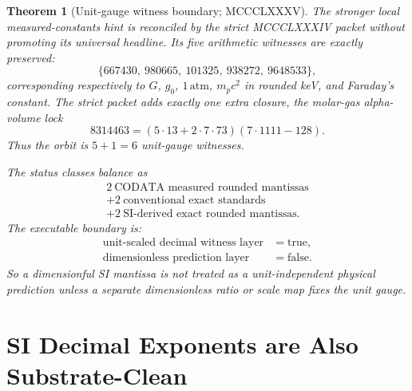 \documentclass[11pt]{article}
\newtheorem{theorem}{Theorem}[section]
\begin{document}
\begin{theorem}[Unit-gauge witness boundary; MCCCLXXXV]\label{thm:unit_gauge_witness_boundary}
The stronger local measured-constants hint is reconciled by the strict
MCCCLXXXIV packet without promoting its universal headline.  Its five
arithmetic witnesses are exactly preserved:
\[
  \{667430,\ 980665,\ 101325,\ 938272,\ 9648533\},
\]
corresponding respectively to $G$, $g_0$, $1\,\mathrm{atm}$, $m_pc^2$
in rounded keV, and Faraday's constant.  The strict packet adds exactly
one extra closure, the molar-gas alpha-volume lock
\[
  8314463=(5\cdot13+2\cdot7\cdot73)(7\cdot1111-128).
\]
Thus the orbit is $5+1=6$ unit-gauge witnesses.

The status classes balance as
\[
  \begin{gathered}
  2\ \text{CODATA measured rounded mantissas}\\
  +2\ \text{conventional exact standards}\\
  +2\ \text{SI-derived exact rounded mantissas}.
  \end{gathered}
\]
The executable boundary is:
\[
  \begin{aligned}
  \text{unit-scaled decimal witness layer}&=\mathrm{true},\\
  \text{dimensionless prediction layer}&=\mathrm{false}.
  \end{aligned}
\]
So a dimensionful SI mantissa is not treated as a unit-independent
physical prediction unless a separate dimensionless ratio or scale map
fixes the unit gauge.
\end{theorem}

\section{SI Decimal Exponents are Also Substrate-Clean}\label{sec:si_exponents_substrate}
\end{document}

